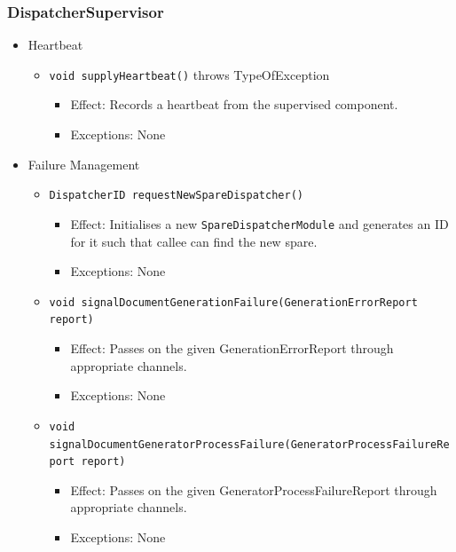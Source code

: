 \documentclass[a4paper,10pt]{article}
\begin{document}
\subsubsection*{DispatcherSupervisor}
\begin{itemize}
	\item Heartbeat
	\begin{itemize}
		\item \texttt{void supplyHeartbeat()} throws TypeOfException
		\begin{itemize}
			\item Effect: Records a heartbeat from the supervised component.
			\item Exceptions: None
		\end{itemize}
	\end{itemize}
\end{itemize}

\begin{itemize}
	\item Failure Management
	\begin{itemize}
		\item \texttt{DispatcherID requestNewSpareDispatcher()}
		\begin{itemize}
			\item Effect: Initialises a new \texttt{SpareDispatcherModule} and generates an ID for it such that callee can find the new spare.
			\item Exceptions: None
		\end{itemize}
		
	    \item \texttt{void signalDocumentGenerationFailure(GenerationErrorReport report)}
	    \begin{itemize}
		    \item Effect: Passes on the given GenerationErrorReport through appropriate channels.
		    \item Exceptions: None
	    \end{itemize}
	
	    \item \texttt{void signalDocumentGeneratorProcessFailure(GeneratorProcessFailureReport report)}
	    \begin{itemize}
		    \item Effect: Passes on the given GeneratorProcessFailureReport through appropriate channels.
		    \item Exceptions: None
	    \end{itemize}
    \end{itemize}
\end{itemize}
\end{document}
